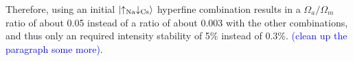 \documentclass[aps,prl,twocolumn,superscriptaddress]{revtex4-1}
\begin{document}
Therefore, using an initial $\ket{\uparrow_{\text{Na}} \downarrow_{\text{Cs}}}$ hyperfine combination results in a $ \Omega_a/\Omega_m$ ratio of about 0.05 instead of a ratio of about 0.003 with the other combinations, and thus only an required intensity stability of 5\% instead of 0.3\%.
\textcolor{blue}{(clean up the paragraph some more).} %
\end{document}
